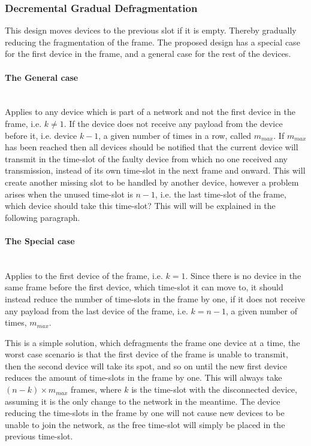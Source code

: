 \subsubsection{Decremental Gradual Defragmentation}
This design moves devices to the previous slot if it is empty. 
Thereby gradually reducing the fragmentation of the frame.
The proposed design has a special case for the first device in the frame, and a general case for the rest of the devices.

\paragraph{The General case}\hfill\\
Applies to any device which is part of a network and not the first device in the frame, i.e. $k \neq 1$.
If the device does not receive any payload from the device before it, i.e. device $k - 1$, a given number of times in a row, called $m_{max}$.
If $m_{max}$ has been reached then all devices should be notified that the current device will transmit in the time-slot of the faulty device from which no one received any transmission, instead of its own time-slot in the next frame and onward. 
This will create another missing slot to be handled by another device, however a problem arises when the unused time-slot is $n - 1$, i.e. the last time-slot of the frame, which device should take this time-slot?
This will will be explained in the following paragraph.

\paragraph{The Special case}\hfill\\
Applies to the first device of the frame, i.e. $k = 1$. 
Since there is no device in the same frame before the first device, which time-slot it can move to, it should instead reduce the number of time-slots in the frame by one, if it does not receive any payload from the last device of the frame, i.e. $k = n - 1$, a given number of times, $m_{max}$. 


\bigskip \noindent
This is a simple solution, which defragments the frame one device at a time, the worst case scenario is that the first device of the frame is unable to transmit, then the second device will take its spot, and so on until the new first device reduces the amount of time-slots in the frame by one. 
This will always take $(n - k) \times m_{max}$ frames, where $k$ is the time-slot with the disconnected device, assuming it is the only change to the network in the meantime. 
The device reducing the time-slots in the frame by one will not cause new devices to be unable to join the network, as the free time-slot will simply be placed in the previous time-slot. 

